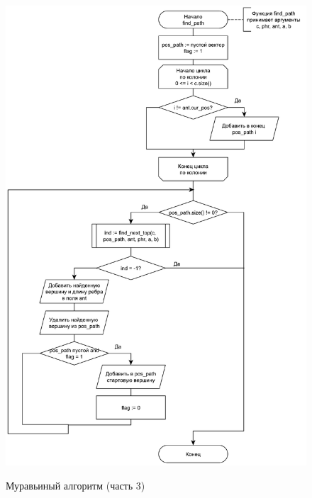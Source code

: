 \begin{figure}[h]
	\begin{center}
		{\includegraphics[scale = 0.6]{schemes/ant3}}
		\caption{Муравьиный алгоритм (часть 3)}
		\label{fig5:image}
	\end{center}
\end{figure}

